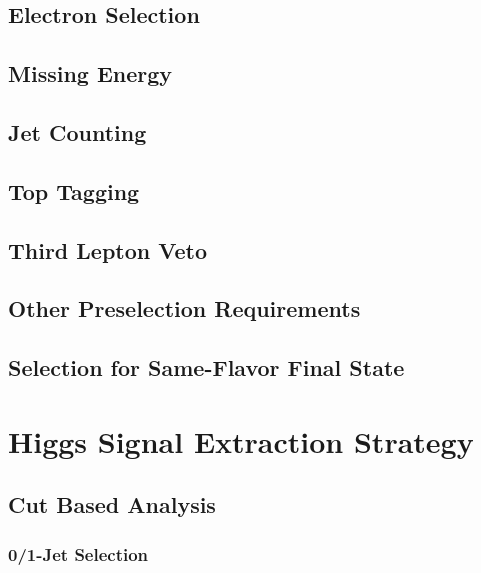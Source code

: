 \documentclass{cmspaper}
\begin{document}
   \subsection{Electron Selection} 
     \label{sec:sel_electrons}
   \subsection{Missing Energy} 
     \label{sec:sel_met}
   \subsection{Jet Counting} 
     \label{sec:sel_jets}
  \subsection{Top Tagging}
     \label{sec:sel_toptag}
   \subsection{Third Lepton Veto}
     \label{sec:sel_lepveto}
   \subsection{Other Preselection Requirements}
     \label{sec:sel_other}
   \subsection{Selection for Same-Flavor Final State}
     \label{sec:sel_sf}

\section{Higgs Signal Extraction Strategy}
   \label{sec:signal_selection}
   \subsection{Cut Based Analysis}
     \label{sec:anal_cutbased}
    \subsubsection{0/1-Jet Selection}
      \label{sec:sel_zerojet}
\end{document}
